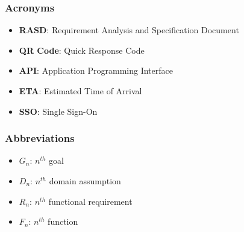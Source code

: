 \subsubsection{Acronyms}
\begin{itemize}
    \item \textbf{RASD}: Requirement Analysis and Specification Document
    \item \textbf{QR Code}: Quick Response Code
    \item \textbf{API}: Application Programming Interface
    \item \textbf{ETA}: Estimated Time of Arrival
    \item \textbf{SSO}: Single Sign-On
\end{itemize}
\subsubsection{Abbreviations}
\begin{itemize}
    \item \textbf{$G_n$}: $n^{th}$ goal
    \item \textbf{$D_n$}: $n^{th}$ domain assumption
    \item \textbf{$R_n$}: $n^{th}$ functional requirement
    \item \textbf{$F_n$}: $n^{th}$ function
\end{itemize}

